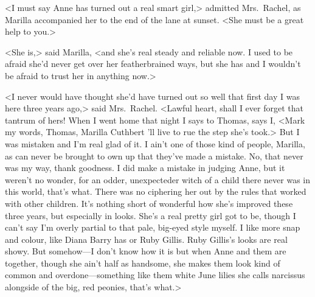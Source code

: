 <I must say Anne has turned out a real smart girl,> admitted Mrs.~Rachel, as Marilla accompanied her to the end of the lane at sunset. <She must be a great help to you.>

<She is,> said Marilla, <and she's real steady and reliable now. I used to be afraid she'd never get over her featherbrained ways, but she has and I wouldn't be afraid to trust her in anything now.>

<I never would have thought she'd have turned out so well that first day I was here three years ago,> said Mrs.~Rachel. <Lawful heart, shall I ever forget that tantrum of hers! When I went home that night I says to Thomas, says I, <Mark my words, Thomas, Marilla Cuthbert 'll live to rue the step she's took.> But I was mistaken and I'm real glad of it. I ain't one of those kind of people, Marilla, as can never be brought to own up that they've made a mistake. No, that never was my way, thank goodness. I did make a mistake in judging Anne, but it weren't no wonder, for an odder, unexpecteder witch of a child there never was in this world, that's what. There was no ciphering her out by the rules that worked with other children. It's nothing short of wonderful how she's improved these three years, but especially in looks. She's a real pretty girl got to be, though I can't say I'm overly partial to that pale, big-eyed style myself. I like more snap and colour, like Diana Barry has or Ruby Gillis. Ruby Gillis's looks are real showy. But somehow—I don't know how it is but when Anne and them are together, though she ain't half as handsome, she makes them look kind of common and overdone—something like them white June lilies she calls narcissus alongside of the big, red peonies, that's what.>
